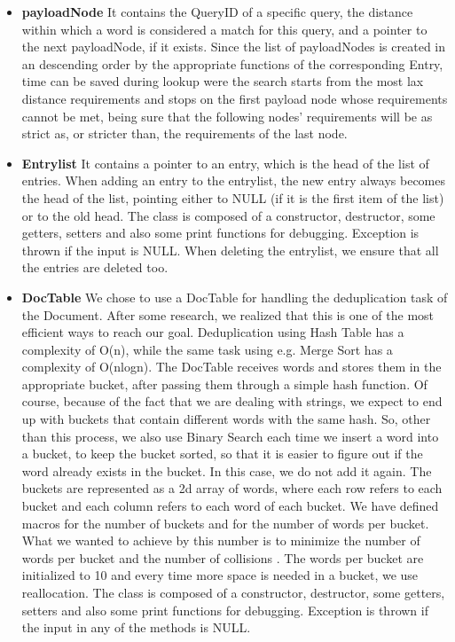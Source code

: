 \documentclass{article}
\begin{document}
\begin{itemize}
  \item \textbf{payloadNode}
  It contains the QueryID of a specific query, the distance within which a word is considered a match for this query, and a pointer to the next payloadNode, if it exists. Since the list of payloadNodes is created in an descending order by the appropriate functions of the corresponding Entry, time can be saved during lookup were the search starts from the most lax distance requirements and stops on the first payload node whose requirements cannot be met, being sure that the following nodes' requirements will be as strict as, or stricter than, the requirements of the last node. 
  \item \textbf{Entrylist} 
  It contains a pointer to an entry, which is the head of the list of entries. When adding an entry to the entrylist, the new entry always becomes the head of the list, pointing either to NULL (if it is the first item of the list) or to the old head. The class is composed of a constructor, destructor, some getters, setters and also some print functions for debugging. Exception is thrown if the input is NULL.
  When deleting the entrylist, we ensure that all the entries are deleted too.
  \item \textbf{DocTable}
  We chose to use a DocTable for handling the deduplication task of the Document. After some research, we realized that this is one of the most efficient ways to reach our goal.
  Deduplication using Hash Table has a complexity of O(n), while the same task using e.g. Merge Sort has a complexity of O(nlogn). The DocTable receives words and stores them in the appropriate bucket, after passing them through a simple hash function. Of course, because of the fact that we are dealing with strings, we expect to end up with buckets that contain different words with the same hash. So, other than this process, we also use Binary Search each time we insert a word into a bucket, to keep the bucket sorted, so that it is easier to figure out if the word already exists in the bucket. In this case, we do not add it again.
  The buckets are represented as a 2d array of words, where each row refers to each bucket and each column refers to each word of each bucket. We have defined macros for the number of buckets and for the number of words per bucket. What we wanted to achieve by this number is  to minimize the number of words per bucket and the number of collisions . The words per bucket are initialized to 10 and every time more space is needed in a bucket, we use reallocation. The class is composed of a constructor, destructor, some getters, setters and also some print functions for debugging. Exception is thrown if the input in any of the methods is NULL.

\end{itemize}
\end{document}
